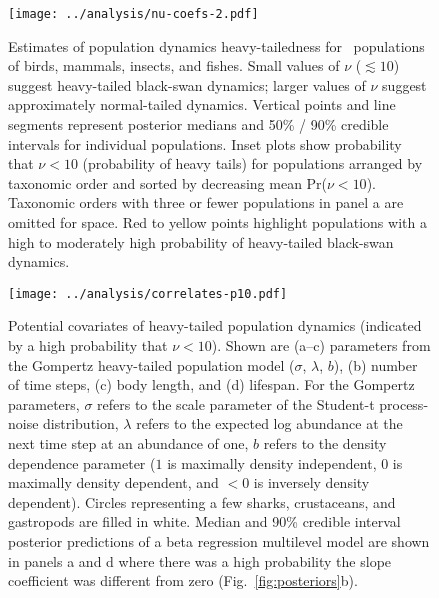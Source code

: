 \clearpage

\begin{figure}[htbp]
\begin{center}
\texttt{[image: ../analysis/nu-coefs-2.pdf]}

\caption{Estimates of population dynamics heavy-tailedness for \nuCoefPopN\
  populations of birds, mammals, insects, and fishes. Small values of $\nu$
  ($\lesssim 10$) suggest heavy-tailed black-swan dynamics; larger values of
  $\nu$ suggest approximately normal-tailed dynamics. Vertical points and line
  segments represent posterior medians and 50\% / 90\% credible intervals for
  individual populations. Inset plots show probability that $\nu < 10$
  (probability of heavy tails) for populations arranged by taxonomic order and
  sorted by decreasing mean Pr($\nu < 10$). Taxonomic orders with three or
  fewer populations in panel a are omitted for space. Red to yellow points
  highlight populations with a high to moderately high probability of
  heavy-tailed black-swan dynamics.}

\label{fig:nu-coefs}
\end{center}
\end{figure}
\clearpage

\begin{figure}[htbp]
\begin{center}
\texttt{[image: ../analysis/correlates-p10.pdf]}

\caption{Potential covariates of heavy-tailed population dynamics (indicated
  by a high probability that $\nu < 10$). Shown are (a--c) parameters from the
  Gompertz heavy-tailed population model ($\sigma$, $\lambda$, $b$), (b)
  number of time steps, (c) body length, and (d) lifespan. For the Gompertz
  parameters, $\sigma$ refers to the scale parameter of the Student-t
  process-noise distribution, $\lambda$ refers to the expected log abundance
  at the next time step at an abundance of one, $b$ refers to the density
  dependence parameter ($1$ is maximally density independent, $0$ is maximally
  density dependent, and $<0$ is inversely density dependent). Circles
  representing a few sharks, crustaceans, and gastropods are filled in white.
  Median and 90\% credible interval posterior predictions of a beta regression
  multilevel model are shown in panels a and d where there was a high
  probability the slope coefficient was different from zero
  (Fig.~\ref{fig:posteriors}b).}

\label{fig:correlates}
\end{center}
\end{figure}


